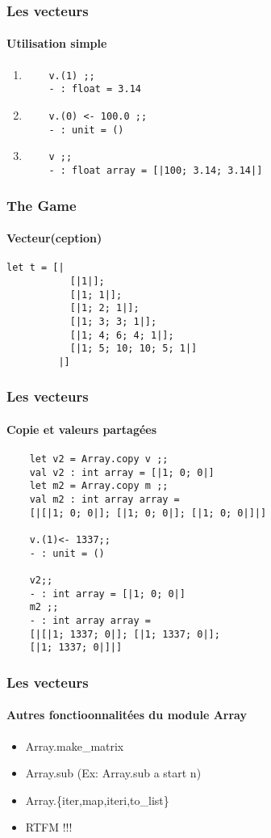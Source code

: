 \begin{frame}[fragile]
\frametitle{Les vecteurs}
\framesubtitle{Utilisation simple}
	\begin{enumerate}
	\item
	\begin{lstlisting}
	v.(1) ;;
	- : float = 3.14
	\end{lstlisting}

	\item
	\begin{lstlisting}
	v.(0) <- 100.0 ;;
	- : unit = ()
	\end{lstlisting}

	\item
	\begin{lstlisting}
	v ;;
	- : float array = [|100; 3.14; 3.14|]
	\end{lstlisting}
	\end{enumerate}
\end{frame}

\begin{frame}[fragile]
\frametitle{The Game}
\framesubtitle{Vecteur(ception)}
\begin{lstlisting}
let t = [| 
           [|1|];
           [|1; 1|];
           [|1; 2; 1|];
           [|1; 3; 3; 1|];
           [|1; 4; 6; 4; 1|];
           [|1; 5; 10; 10; 5; 1|]
         |] 
	\end{lstlisting}
\end{frame}

\begin{frame}[fragile]
\frametitle{Les vecteurs}
\framesubtitle{Copie et valeurs partagées}
\begin{lstlisting}
	let v2 = Array.copy v ;;
	val v2 : int array = [|1; 0; 0|]
	let m2 = Array.copy m ;;
	val m2 : int array array = 
	[|[|1; 0; 0|]; [|1; 0; 0|]; [|1; 0; 0|]|]

	v.(1)<- 1337;;
	- : unit = ()

	v2;; 
	- : int array = [|1; 0; 0|]
	m2 ;;
	- : int array array = 
	[|[|1; 1337; 0|]; [|1; 1337; 0|]; 
	[|1; 1337; 0|]|]
\end{lstlisting}
\end{frame}

\begin{frame}[fragile]
\frametitle{Les vecteurs}
\framesubtitle{Autres fonctioonnalitées du module Array}
\begin{itemize}
	\item Array.make\_matrix
	
	\item Array.sub (Ex: Array.sub a start n)
	
	\item Array.\{iter,map,iteri,to\_list\}

	\item RTFM !!!
\end{itemize}
\end{frame}

